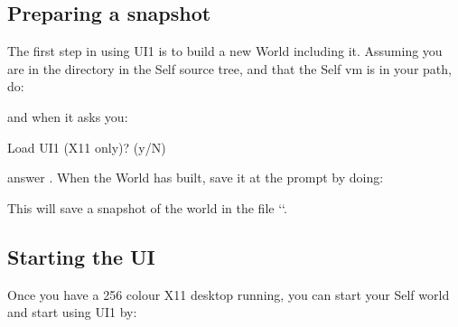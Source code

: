 \documentclass[letterpaper,10pt,english]{sphinxmanual}
\begin{document}
\subsection{Preparing a snapshot}
\label{\detokenize{ui1:preparing-a-snapshot}}
The first step in using UI1 is to build a new World including it. Assuming you are in the  directory in the Self source tree, and that the Self vm is in your path, do:

\begin{sphinxVerbatim}[commandchars=\\\{\}]
  
\end{sphinxVerbatim}

and when it asks you:

\begin{sphinxVerbatim}[commandchars=\\\{\}]
Load UI1 (X11 only)? (y/N)
\PYGZgt{}
\end{sphinxVerbatim}

answer . When the World has built, save it at the prompt by doing:

\begin{sphinxVerbatim}[commandchars=\\\{\}]
\end{sphinxVerbatim}

This will save a snapshot of the world in the file ``.


\subsection{Starting the UI}
\label{\detokenize{ui1:starting-the-ui}}
Once you have a 256 colour X11 desktop running, you can start your Self world and start using UI1 by:

\begin{sphinxVerbatim}[commandchars=\\\{\}]
    
 
\end{sphinxVerbatim}



\renewcommand{\indexname}{Index}
\printindex
\end{document}
